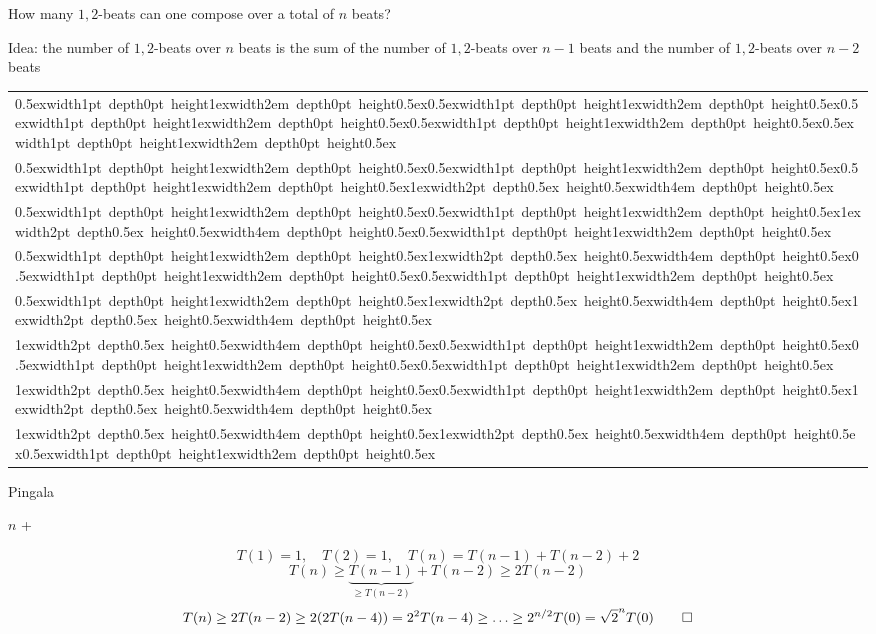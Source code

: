 \begin{example}
\label{ex:pingala}
How many $1,2$-beats can one compose over a total of $n$ beats?

Idea: the number of $1,2$-beats over $n$ beats is the sum of the number of $1,2$-beats over $n-1$ beats and the number of $1,2$-beats over $n-2$ beats
\def\TA{\raise0.5ex\hbox{\vrule width1pt depth0pt height1ex\vrule width2em depth0pt height0.5ex}}
\def\TAA{\raise1ex\hbox{\color{gray}\vrule width2pt depth0.5ex height0.5ex\vrule width4em depth0pt height0.5ex}}
\begin{center}
    \vspace{0em}
    \begin{tabular}[b]{l}
        \TA\hspace{1em}\TA\TA\TA\TA \\
        \TA\hspace{1em}\TA\TA\TAA \\
        \TA\hspace{1em}\TA\TAA\TA \\
        \TA\hspace{1em}\TAA\TA\TA \\
        \TA\hspace{1em}\TAA\TAA \\
    
        \TAA\hspace{1em}\TA\TA\TA \\
        \TAA\hspace{1em}\TA\TAA \\
        \TAA\hspace{1em}\TAA\TA \\
      \end{tabular}
\end{center}


\begin{algorithm}[htb] %
    \caption{Pingala}
    \begin{algorithmic}[1]
     
            \State \Return $n$
        \EndIf
        \State \Return {} + 
    \EndFunction
    \end{algorithmic}
\end{algorithm}


\vspace{-0.1em}
\[
T(1) = 1, \quad T(2) = 1, \quad T(n) = T(n-1) + T(n-2) + 2
\]
\[
 T(n) \geq \underbrace{T(n-1)}_{\geq T(n-2)} + T(n-2)  \geq 2T(n-2)
\]
\[
T(n) \geq 2T(n-2) \geq 2(2T(n-4)) = 2^2T(n-4) \geq \ldots \geq 2^{n/2}T(0) = \sqrt{2}^n T(0)  
\qedhere
\]
\end{example}


